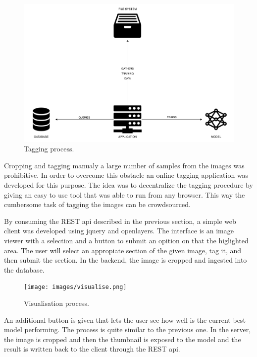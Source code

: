 \begin{figure}[h]
  \centering
  \includegraphics[width=1\textwidth]{images/train-diagram.png}
  \caption{Tagging process.}
  \label{fig:train}
\end{figure}

Cropping and tagging manualy a large number of samples from the images was prohibitive. In order to overcome this obstacle an online tagging application was developed for this purpose. The idea was to decentralize the tagging procedure by giving an easy to use tool that was able to run from any browser. This way the cumbersome task of tagging the images can be crowdsourced.

By consuming the REST api described in the previous section, a simple web client was developed using jquery and openlayers. The interface is an image viewer with a selection and a button to submit an opition on that the higlighted area. The user will select an appropiate section of the given image, tag it, and then submit the section. In the backend, the image is cropped and ingested into the database.





\begin{figure}[h]
  \centering
  \texttt{[image: images/visualise.png]}
  \caption{Visualisation process.}
  \label{fig:visualise}
\end{figure}


An additional button is given that lets the user see how well is the current best model performing. The process is quite similar to the previous one. In the server, the image is cropped and then the thumbnail is exposed to the model and the result is written back to the client through the REST api.

